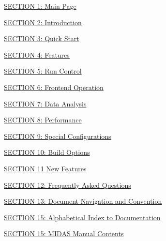 \begin{TabularC}{1}
\hline

\begin{DoxyItemize}
\item \hyperlink{index_Top}{SECTION 1: Main Page} 
\item \hyperlink{Intro}{SECTION 2: Introduction} 
\item \hyperlink{Quickstart}{SECTION 3: Quick Start} 
\item \hyperlink{Features}{SECTION 4: Features} 
\item \hyperlink{RunControl}{SECTION 5: Run Control} 
\item \hyperlink{FrontendOperation}{SECTION 6: Frontend Operation} 
\item \hyperlink{DataAnalysis}{SECTION 7: Data Analysis} 
\item \hyperlink{Performance}{SECTION 8: Performance} 
\item \hyperlink{SpecialConfig}{SECTION 9: Special Configurations} 
\item \hyperlink{BuildingOptions}{SECTION 10: Build Options} 
\item \hyperlink{NDF}{SECTION 11 New Features} 
\item \hyperlink{FAQ}{SECTION 12: Frequently Asked Questions} 
\item \hyperlink{Convention}{SECTION 13: Document Navigation and Convention} 
\item \hyperlink{DocIndex}{SECTION 15: Alphabetical Index to Documentation} 
\item \hyperlink{Organization}{SECTION 15: MIDAS Manual Contents} 
\end{DoxyItemize}\\
\end{TabularC}


\label{index_end}
\hypertarget{index_end}{}


\par
 

\par


 